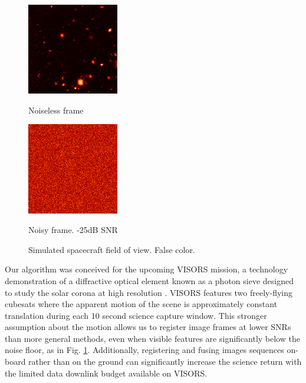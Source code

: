 \documentclass{article}
\begin{document}
\begin{figure}[htb]
\begin{minipage}[b]{.48\linewidth}
  \centering
  \centerline{\includegraphics[width=4.0cm]{images/frame_clean.png}}
  \centerline{Noiseless frame}\medskip
\end{minipage}
\hfill
\begin{minipage}[b]{0.48\linewidth}
  \centering
  \centerline{\includegraphics[width=4.0cm]{images/frame.png}}
  \centerline{Noisy frame. -25dB SNR}\medskip
\end{minipage}
  \caption{Simulated spacecraft field of view.  False color.}
\label{fig:scene}
\end{figure}

Our algorithm was conceived for the upcoming VISORS mission, a technology demonstration of a diffractive optical element known as a photon sieve designed to study the solar corona at high resolution \cite{gundamraj2021preliminary} \cite{koenig2021formation}. VISORS features two freely-flying cubesats where the apparent motion of the scene is approximately constant translation during each 10 second science capture window.  This stronger assumption about the motion allows us to register image frames at lower SNRs than more general methods, even when visible features are significantly below the noise floor, as in Fig. \ref{fig:scene}.  Additionally, registering and fusing images sequences on-board rather than on the ground can significantly increase the science return with the limited data downlink budget available on VISORS.

\end{document}
